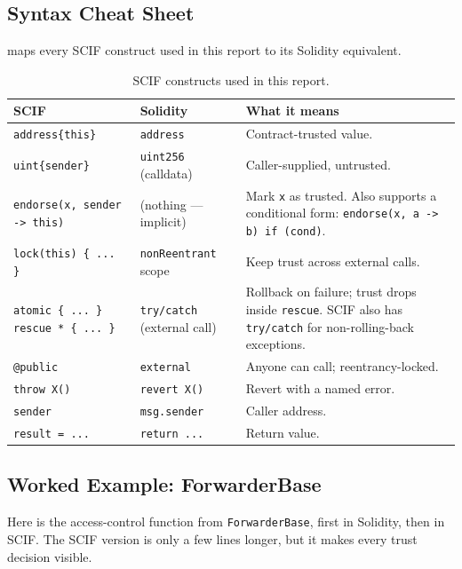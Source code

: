 \documentclass[11pt,a4paper]{article}
\begin{document}
\subsection{Syntax Cheat Sheet}
\label{sec:primer-syntax}

 maps every SCIF construct used in this report to its
Solidity equivalent.

\begin{table}[h]
\centering
\caption{SCIF constructs used in this report.}
\label{tab:scif-syntax}
\small
\begin{tabular}{@{}p{4.8cm}p{4.3cm}p{5.2cm}@{}}
\toprule
\textbf{SCIF} & \textbf{Solidity} & \textbf{What it means} \\
\midrule
\texttt{address\{this\}} & \texttt{address} & Contract-trusted value. \\
\texttt{uint\{sender\}} & \texttt{uint256} (calldata) & Caller-supplied, untrusted. \\
\texttt{endorse(x, sender -> this)} & (nothing --- implicit) & Mark \texttt{x} as trusted. Also supports a conditional form: \texttt{endorse(x, a -> b) if (cond)}. \\
\addlinespace
\texttt{lock(this) \{ ... \}} & \texttt{nonReentrant} scope & Keep trust across external calls. \\
\texttt{atomic \{ ... \} rescue * \{ ... \}} & \texttt{try/catch} (external call) & Rollback on failure; trust drops inside \texttt{rescue}. SCIF also has \texttt{try/catch} for non-rolling-back exceptions. \\
\addlinespace
\texttt{@public} & \texttt{external} & Anyone can call; reentrancy-locked. \\
\texttt{throw X()} & \texttt{revert X()} & Revert with a named error. \\
\texttt{sender} & \texttt{msg.sender} & Caller address. \\
\texttt{result = ...} & \texttt{return ...} & Return value. \\
\bottomrule
\end{tabular}
\end{table}

\subsection{Worked Example: ForwarderBase}
\label{sec:primer-example}

Here is the access-control function from \texttt{ForwarderBase}, first in
Solidity, then in SCIF. The SCIF version is only a few lines longer, but
it makes every trust decision visible.
\end{document}
